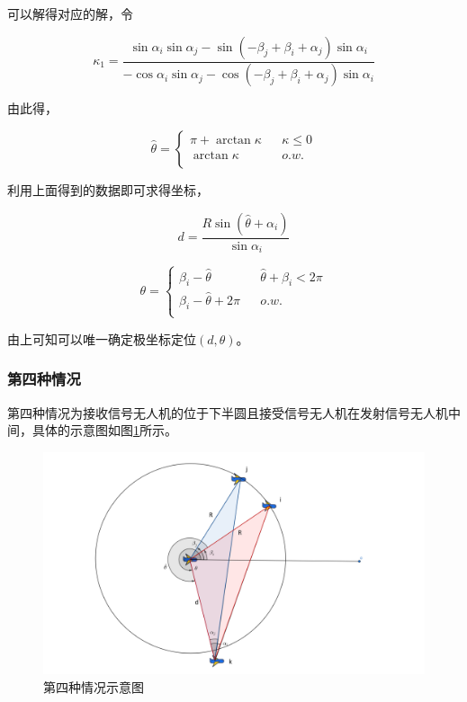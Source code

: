 \documentclass[withoutpreface,bwprint]{cumcmthesis} %
\begin{document}
可以解得对应的解，令 

$$\kappa_1 = \frac{\sin \alpha_i \sin \alpha_j - \sin (-\beta_j + \beta_i + \alpha_j) \sin \alpha_i}{-\cos \alpha_i \sin \alpha_j - \cos(-\beta_j + \beta_i + \alpha_j) \sin \alpha_i}$$


由此得，

$$ 
\hat{\theta}=\left\{
\begin{array}{lcl}
\pi + \arctan \kappa & & {\kappa \leq 0} \\
\arctan \kappa & & {o.w.}\\
\end{array} \right. 
$$

利用上面得到的数据即可求得坐标，

$$ d = \frac{R \sin(\hat{\theta}+\alpha_i )}{\sin \alpha_i}$$

$$ 
\theta=\left\{
\begin{array}{lcl}
\beta_i- \hat{\theta}& & {\hat{\theta}+\beta_i < 2\pi} \\
\beta_i- \hat{\theta} +  2\pi & & {o.w.}\\
\end{array} \right. 
$$

由上可知可以唯一确定极坐标定位$(d,\theta)$。


\subsubsection{第四种情况}
第四种情况为接收信号无人机的位于下半圆且接受信号无人机在发射信号无人机中间，具体的示意图如图\ref{fig:case4}所示。

\begin{figure}[H]
    \centering
    \includegraphics[width=1.0\textwidth]{figures/case 4.png}
    \caption{第四种情况示意图}
    \label{fig:case4}
    
\end{figure}
\end{document}
